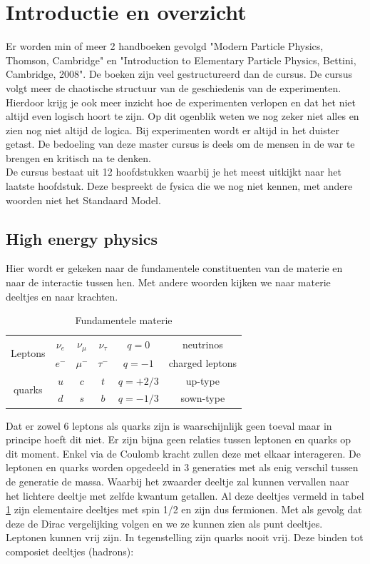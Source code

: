 \documentclass[../main.tex]{subfiles}
\begin{document}
\section{Introductie en overzicht}%
\label{sec:introductie_en_overzicht}

Er worden min of meer 2 handboeken gevolgd "Modern Particle Physics, Thomson, Cambridge" en "Introduction to Elementary Particle Physics,  Bettini, Cambridge, 2008". De boeken zijn veel gestructureerd dan de cursus. De cursus volgt meer de chaotische structuur van de geschiedenis van de experimenten. Hierdoor krijg je ook meer inzicht hoe de experimenten verlopen en dat het niet altijd even logisch hoort te zijn. Op dit ogenblik weten we nog zeker niet alles en zien nog niet altijd de logica. Bij experimenten wordt er altijd in het duister getast. De bedoeling van deze master cursus is deels om de mensen in de war te brengen en kritisch na te denken.\\
De cursus bestaat uit 12 hoofdstukken waarbij je het meest uitkijkt naar het laatste hoofdstuk. Deze bespreekt de fysica die we nog niet kennen, met andere woorden niet het Standaard Model.

\subsection{High energy physics}%
\label{sub:high_energy_physics}
Hier wordt er gekeken naar de fundamentele constituenten van de materie en naar de interactie tussen hen. Met andere woorden kijken we naar materie deeltjes en naar krachten.

\begin{table}[h]
    \centering
    \caption{Fundamentele materie}
    \label{tab:fund_mat}
    \begin{tabular}{cc|c|ccc}
        \multicolumn{1}{c}{\multirow{2}{*}{Leptons}} & $\nu_e$ & $\nu_\mu$ & $\nu_\tau$ & $q=0$ & neutrinos \\
        \multicolumn{1}{c}{}                         & $e^-$ & $\mu^-$ & $\tau^-$ & $q=-1$ & charged leptons \\ \hline
        \multirow{2}{*}{quarks}                      & $u$ & $c$ & $t$ & $q=+2/3$ & up-type \\
                                                     & $d$ & $s$ & $b$ & $q=-1/3$ & sown-type
    \end{tabular}
\end{table}

Dat er zowel 6 leptons als quarks zijn is waarschijnlijk geen toeval maar in principe hoeft dit niet. Er zijn bijna geen relaties tussen leptonen en quarks op dit moment. Enkel via de Coulomb kracht zullen deze met elkaar interageren. De leptonen en quarks worden opgedeeld in 3 generaties met als enig verschil tussen de generatie de massa. Waarbij het zwaarder deeltje zal kunnen vervallen naar het lichtere deeltje met zelfde kwantum getallen. Al deze deeltjes vermeld in tabel \ref{tab:fund_mat} zijn elementaire deeltjes met spin 1/2 en zijn dus fermionen. Met als gevolg dat deze de Dirac vergelijking volgen en we ze kunnen zien als punt deeltjes.\\
Leptonen kunnen vrij zijn. In tegenstelling zijn quarks nooit vrij. Deze binden tot composiet deeltjes (hadrons):
\end{document}
